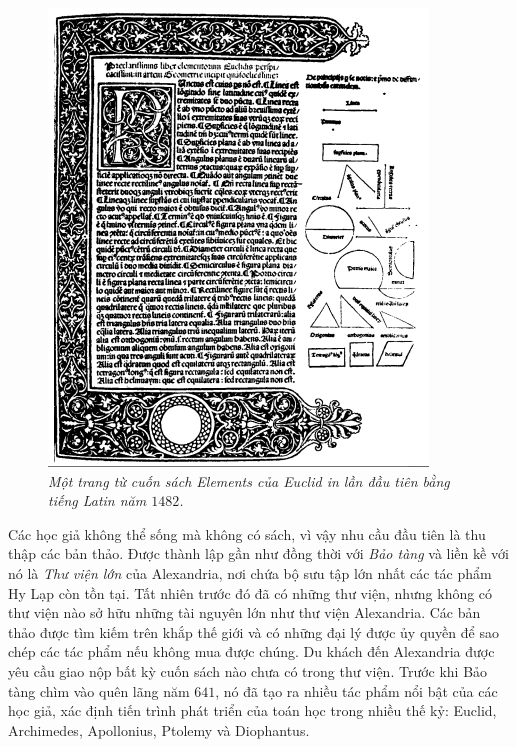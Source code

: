 \begin{multicols}{2}
\begin{figure}[H]
		\includegraphics[width= 1\linewidth]{2}
		\caption{\small\textit{\color{lichsutoanhoc}Một trang từ cuốn sách Elements của Euclid in lần đầu tiên bằng tiếng Latin năm $1482$.}}
		\vspace*{-10pt}
	\end{figure} 
	Các học giả không thể sống mà không có sách, vì vậy nhu cầu đầu tiên là thu thập các bản thảo. Được thành lập gần như đồng thời với \textit{Bảo tàng} và liền kề với nó là \textit{Thư viện lớn} của Alexandria, nơi chứa bộ sưu tập lớn nhất các tác phẩm Hy Lạp còn tồn tại. Tất nhiên trước đó đã có những thư viện, nhưng không có thư viện nào sở hữu những tài nguyên lớn như thư viện Alexandria. Các bản thảo được tìm kiếm trên khắp thế giới và có những đại lý được ủy quyền để sao chép các tác phẩm nếu không mua được chúng. Du khách đến Alexandria được yêu cầu giao nộp bất kỳ cuốn sách nào chưa có trong thư viện.
	\vskip 0.1cm
	Trước khi Bảo tàng chìm vào quên lãng năm $641$, nó đã tạo ra nhiều tác phẩm nổi bật của các học giả, xác định tiến trình phát triển của toán học trong nhiều thế kỷ: Euclid, Archimedes, Apollonius, Ptolemy và Diophantus.
	\vskip 0.1cm

\end{multicols}
